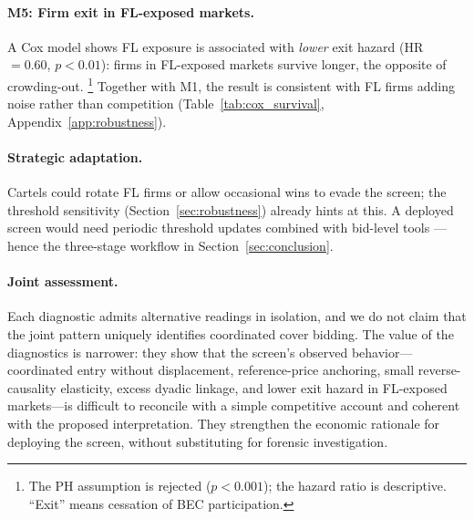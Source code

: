 \paragraph{M5: Firm exit in FL-exposed markets.}
A Cox model shows FL exposure is associated with \emph{lower} exit
hazard (HR~$= 0.60$, $p < 0.01$): firms in FL-exposed markets survive
longer, the opposite of crowding-out.%
\footnote{The PH assumption is rejected ($p < 0.001$); the hazard
ratio is descriptive. ``Exit'' means cessation of BEC participation.}
Together with M1, the result is consistent with FL firms adding
noise rather than competition
(Table~\ref{tab:cox_survival}, Appendix~\ref{app:robustness}).

\paragraph{Strategic adaptation.}
Cartels could rotate FL firms or allow occasional wins to evade the
screen; the threshold sensitivity (Section~\ref{sec:robustness})
already hints at this. A deployed screen would need periodic threshold
updates combined with bid-level tools
\citep{harrington2008detecting}---hence the three-stage workflow in
Section~\ref{sec:conclusion}.

\paragraph{Joint assessment.}
Each diagnostic admits alternative readings in isolation, and we do
not claim that the joint pattern uniquely identifies coordinated
cover bidding. The value of the diagnostics is narrower: they show
that the screen's observed behavior---coordinated entry without
displacement, reference-price anchoring, small reverse-causality
elasticity, excess dyadic linkage, and lower exit hazard in FL-exposed
markets---is difficult to reconcile with a simple competitive account
and coherent with the proposed interpretation. They strengthen the
economic rationale for deploying the screen, without substituting for
forensic investigation.



